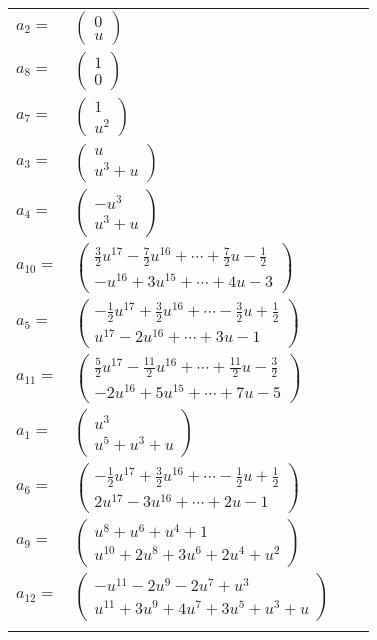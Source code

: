 \documentclass[1p]{elsarticle_modified}
\theoremstyle{definition}
\begin{document}
\begin{tabular}{m{7pt} m{180pt} m{7pt} m{180pt} }
\flushright $a_{2}=$&$\begin{pmatrix}0\\u\end{pmatrix}$ \\
\flushright $a_{8}=$&$\begin{pmatrix}1\\0\end{pmatrix}$ \\
\flushright $a_{7}=$&$\begin{pmatrix}1\\u^2\end{pmatrix}$ \\
\flushright $a_{3}=$&$\begin{pmatrix}u\\u^3+u\end{pmatrix}$ \\
\flushright $a_{4}=$&$\begin{pmatrix}- u^3\\u^3+u\end{pmatrix}$ \\
\flushright $a_{10}=$&$\begin{pmatrix}\frac{3}{2} u^{17}-\frac{7}{2} u^{16}+\cdots+\frac{7}{2} u-\frac{1}{2}\\- u^{16}+3 u^{15}+\cdots+4 u-3\end{pmatrix}$ \\
\flushright $a_{5}=$&$\begin{pmatrix}-\frac{1}{2} u^{17}+\frac{3}{2} u^{16}+\cdots-\frac{3}{2} u+\frac{1}{2}\\u^{17}-2 u^{16}+\cdots+3 u-1\end{pmatrix}$ \\
\flushright $a_{11}=$&$\begin{pmatrix}\frac{5}{2} u^{17}-\frac{11}{2} u^{16}+\cdots+\frac{11}{2} u-\frac{3}{2}\\-2 u^{16}+5 u^{15}+\cdots+7 u-5\end{pmatrix}$ \\
\flushright $a_{1}=$&$\begin{pmatrix}u^3\\u^5+u^3+u\end{pmatrix}$ \\
\flushright $a_{6}=$&$\begin{pmatrix}-\frac{1}{2} u^{17}+\frac{3}{2} u^{16}+\cdots-\frac{1}{2} u+\frac{1}{2}\\2 u^{17}-3 u^{16}+\cdots+2 u-1\end{pmatrix}$ \\
\flushright $a_{9}=$&$\begin{pmatrix}u^8+u^6+u^4+1\\u^{10}+2 u^8+3 u^6+2 u^4+u^2\end{pmatrix}$ \\
\flushright $a_{12}=$&$\begin{pmatrix}- u^{11}-2 u^9-2 u^7+u^3\\u^{11}+3 u^9+4 u^7+3 u^5+u^3+u\end{pmatrix}$\\&\end{tabular}
\end{document}
